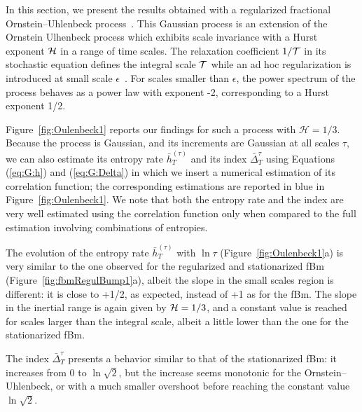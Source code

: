 \documentclass[aps,pra,groupedaddress,notitlepage]{revtex4-1}
\begin{document}
In this section, we present the results obtained with a regularized fractional Ornstein--Uhlenbeck process~\cite{Chevillard2017}.
This Gaussian process is an extension of the Ornstein Ulhenbeck process which exhibits scale invariance with a Hurst exponent ${\cal H}$ in a range of time scales. The relaxation coefficient $1/{\cal T}$ in its stochastic equation defines the integral scale ${\cal T}$ while an ad hoc regularization is introduced at small scale $\epsilon$~\cite{Chevillard2017}. For scales smaller than $\epsilon$,
the power spectrum of the process behaves as a power law with exponent -2, corresponding to a Hurst exponent 1/2. 

Figure~\ref{fig:Oulenbeck1} reports our findings for such a process with $\mathcal{H}=1/3$. Because the process is Gaussian, and its increments are Gaussian at all scales $\tau$, we can also estimate its entropy rate $\bar{h}_T^{(\tau)}$ and its index $\bar{\Delta}_T^{\tau}$ using Equations (\ref{eq:G:h}) and (\ref{eq:G:Delta}) in which we insert a numerical estimation of its correlation function; the corresponding estimations are reported in blue in Figure~\ref{fig:Oulenbeck1}.
We note that both the entropy rate and the index are very well estimated using the correlation function only when compared to the full estimation involving combinations of entropies.

The evolution of the entropy rate $\bar{h}_T^{(\tau)}$ with $\ln \tau$ (Figure~\ref{fig:Oulenbeck1}a) is very similar to the one observed for the regularized and stationarized fBm (Figure~\ref{fig:fbmRegulBump1}a), albeit the slope in the small scales region is different: it is close to +1/2, as expected, instead of +1 as for the fBm. 
The slope in the inertial range is again given by ${\cal H}=1/3$, and a constant value is reached for scales larger than the integral scale, albeit a little lower than the one for the stationarized fBm.

The index $\bar{\Delta}_T^{\tau}$ presents a behavior similar to that of the stationarized fBm: it increases from 0 to $\ln\sqrt{2}$, but the increase seems monotonic for the Ornstein--Uhlenbeck, or with a much smaller overshoot before reaching the constant value $\ln\sqrt{2}$. 
\end{document}
